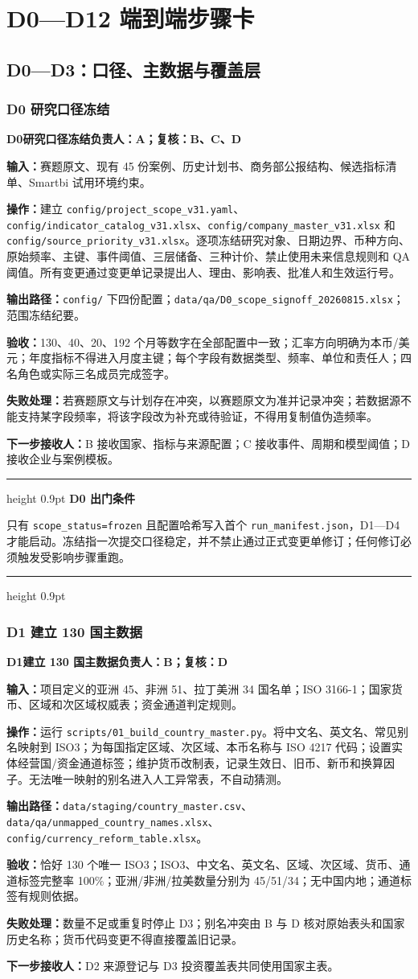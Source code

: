 \documentclass[UTF8,fontset=windows,12pt,openany]{ctexbook}
\newenvironment{gatebox}[1][]{%
  \par\medskip\noindent\begin{center}\begin{minipage}{0.93\textwidth}%
  \color{GoldLine}\hrule height 0.9pt\vspace{0.45em}%
  \textbf{#1}\par\smallskip\color{black}%
}{%
  \par\vspace{0.35em}\color{GoldLine}\hrule height 0.9pt%
  \end{minipage}\end{center}\medskip%
}
\newcommand{\Field}[1]{{\small\nolinkurl{#1}}}
\newcommand{\File}[1]{{\small\nolinkurl{#1}}}
\newcommand{\StepTitle}[3]{%
  \noindent\colorbox{DeepNavy}{\parbox{0.965\textwidth}{\color{white}\Large\bfseries #1\quad #2\hfill\normalsize #3}}\par\medskip
}
\newcommand{\CardRow}[2]{\noindent\textbf{#1：}#2\par}
\begin{document}
\part{D0—D12 端到端步骤卡}

\chapter{D0—D3：口径、主数据与覆盖层}

\section{D0 研究口径冻结}
\StepTitle{D0}{研究口径冻结}{负责人：A；复核：B、C、D}
\CardRow{输入}{赛题原文、现有 45 份案例、历史计划书、商务部公报结构、候选指标清单、Smartbi 试用环境约束。}
\CardRow{操作}{建立 \File{config/project_scope_v31.yaml}、\File{config/indicator_catalog_v31.xlsx}、\File{config/company_master_v31.xlsx} 和 \File{config/source_priority_v31.xlsx}。逐项冻结研究对象、日期边界、币种方向、原始频率、主键、事件阈值、三层储备、三种计价、禁止使用未来信息规则和 QA 阈值。所有变更通过变更单记录提出人、理由、影响表、批准人和生效运行号。}
\CardRow{输出路径}{\File{config/} 下四份配置；\File{data/qa/D0_scope_signoff_20260815.xlsx}；范围冻结纪要。}
\CardRow{验收}{130、40、20、192 个月等数字在全部配置中一致；汇率方向明确为本币/美元；年度指标不得进入月度主键；每个字段有数据类型、频率、单位和责任人；四名角色或实际三名成员完成签字。}
\CardRow{失败处理}{若赛题原文与计划存在冲突，以赛题原文为准并记录冲突；若数据源不能支持某字段频率，将该字段改为补充或待验证，不得用复制值伪造频率。}
\CardRow{下一步接收人}{B 接收国家、指标与来源配置；C 接收事件、周期和模型阈值；D 接收企业与案例模板。}

\begin{gatebox}[D0 出门条件]
只有 \Field{scope_status=frozen} 且配置哈希写入首个 \File{run_manifest.json}，D1—D4 才能启动。冻结指一次提交口径稳定，并不禁止通过正式变更单修订；任何修订必须触发受影响步骤重跑。
\end{gatebox}

\newpage
\section{D1 建立 130 国主数据}
\StepTitle{D1}{建立 130 国主数据}{负责人：B；复核：D}
\CardRow{输入}{项目定义的亚洲 45、非洲 51、拉丁美洲 34 国名单；ISO 3166-1；国家货币、区域和次区域权威表；资金通道判定规则。}
\CardRow{操作}{运行 \File{scripts/01_build_country_master.py}。将中文名、英文名、常见别名映射到 ISO3；为每国指定区域、次区域、本币名称与 ISO 4217 代码；设置实体经营国/资金通道标签；维护货币改制表，记录生效日、旧币、新币和换算因子。无法唯一映射的别名进入人工异常表，不自动猜测。}
\CardRow{输出路径}{\File{data/staging/country_master.csv}、\File{data/qa/unmapped_country_names.xlsx}、\File{config/currency_reform_table.xlsx}。}
\CardRow{验收}{恰好 130 个唯一 ISO3；ISO3、中文名、英文名、区域、次区域、货币、通道标签完整率 100\%；亚洲/非洲/拉美数量分别为 45/51/34；无中国内地；通道标签有规则依据。}
\CardRow{失败处理}{数量不足或重复时停止 D3；别名冲突由 B 与 D 核对原始表头和国家历史名称；货币代码变更不得直接覆盖旧记录。}
\CardRow{下一步接收人}{D2 来源登记与 D3 投资覆盖表共同使用国家主表。}
\end{document}
